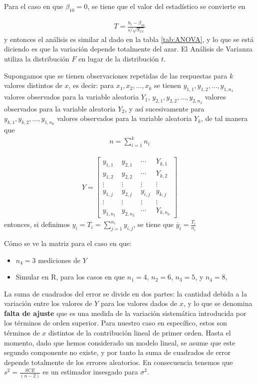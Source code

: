 \begin{itemize}
\begin{enumerate}
Para el caso en que $\beta_{10}=0$, se tiene que el valor del estad\'istico se convierte en 

\begin{eqnarray*}
T=\frac{b_{1}-\beta_{10}}{s/\sqrt{S_{xx}}}
\end{eqnarray*}
y entonces el an\'alisis es similar al dado en la tabla \ref{tab:ANOVA}, y lo que se est\'a diciendo es que la variaci\'on depende totalmente del azar. El An\'alisis de Varianza utiliza la distribuci\'on $F$ en lugar de la distribuci\'on $t$.

Supongamos que se tienen observaciones repetidas de las respuestas para $k$ valores distintos de $x$, es decir: para $x_{1},x_{2},\ldots,x_{k}$ se tienen $y_{1,1},y_{1,2},\ldots,y_{1,n_{1}}$ valores observados para la variable aleatoria $Y_{1}$, $y_{2,1},y_{2,2},\ldots,y_{2,n_{2}}$ valores observados para la variable aleatoria $Y_{2}$, y as\'i sucesivamente para $y_{k,1},y_{k,2},\ldots,y_{1,n_{k}}$ valores observados para la variable aleatoria $Y_{k}$, de tal manera que 
\begin{eqnarray*}
n=\sum_{i=1}^{k}n_{i}
\end{eqnarray*}

\begin{eqnarray*}
Y = \left[
\begin{matrix}
y_{1,1} & y_{2,1} & \cdots & Y_{k,1} \\ 
y_{1,2} & y_{2,2} & \cdots & Y_{k,2} \\ 
\vdots & \vdots &  \vdots & \vdots \\ 
 y_{1,j} &  y_{2,j} & y_{i,j} &  y_{k,j} \\ 
\vdots & \vdots & \vdots & \vdots \\ 
y_{1,n_{1}} & y_{2,n_{2}} & \cdots & Y_{k,n_{k}} 
\end{matrix} 
\right]
\end{eqnarray*}
entonces, si definimos $y_{i}=T_{i}=\sum_{j=1}^{n_{i}}y_{i,j}$, se tiene que $\overline{y}_{i}=\frac{T_{i}}{n_{i}}$

C\'omo se ve la matriz para el caso en que:
\begin{itemize}
\item $n_{4}=3$ mediciones de $Y$
\item Simular en R, para los casos en que $n_{1}=4$, $n_{2}=6$, $n_{3}=5$, y $n_{4}=8$,
\end{itemize}

La suma de cuadrados del error se divide en dos partes: la cantidad debida a la variaci\'on entre los valores de $Y$ para los valores dados de $x$, y lo que se denomina \textbf{falta de ajuste} que es una medida de la variaci\'on sistem\'atica introducida por  los t\'erminos de orden superior. Para nuestro caso en espec\'ifico, estos son t\'erminos de $x$ distintos de la contribuci\'on lineal de primer orden. Hasta el momento, dado que hemos considerado un modelo lineal, se asume que este segundo componente no existe, y por tanto la suma de cuadrados de error depende totalmente de los errores aleatorios. En consecuencia tenemos que $s^{2}=\frac{SCE}{\left(n-2\right)}$ es un estimador insesgado para $\sigma^{2}$.


\end{enumerate}
\end{itemize}
